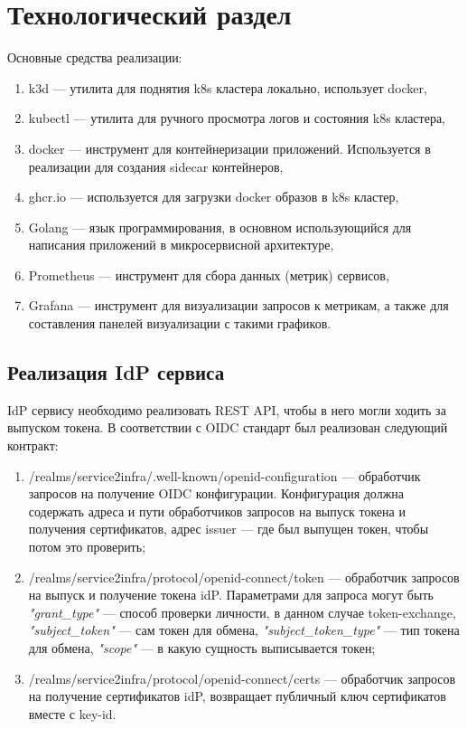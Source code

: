 \chapter{Технологический раздел}

Основные средства реализации:
\begin{enumerate}
\item k3d --- утилита для поднятия k8s кластера локально, использует docker, %
\item kubectl --- утилита для ручного просмотра логов и состояния k8s кластера,
\item docker --- инструмент для контейнеризации приложений. Используется в реализации для создания sidecar контейнеров,
\item ghcr.io --- используется для загрузки docker образов в k8s кластер,
\item Golang --- язык программирования, в основном использующийся для написания приложений в микросервисной архитектуре, %
\item Prometheus --- инструмент для сбора данных (метрик) сервисов,
\item Grafana --- инструмент для визуализации запросов к метрикам, а также для составления панелей визуализации с такими графиков.
\end{enumerate}

\section{Реализация IdP сервиса}

IdP сервису необходимо реализовать REST API, чтобы в него могли ходить за выпуском токена.
В соответствии с OIDC стандарт был реализован следующий контракт:

\begin{enumerate}
\item /realms/service2infra/.well-known/openid-configuration --- обработчик запросов на получение OIDC конфигурации. Конфигурация должна содержать адреса и пути обработчиков запросов на выпуск токена и получения сертификатов, адрес issuer --- где был выпущен токен, чтобы потом это проверить;
\item /realms/service2infra/protocol/openid-connect/token --- обработчик запросов на выпуск и получение токена idP. Параметрами для запроса могут быть \textit{"grant\_type"} --- способ проверки личности, в данном случае token-exchange, \textit{"subject\_token"} --- сам токен для обмена, \textit{"subject\_token\_type"} --- тип токена для обмена, \textit{"scope"} --- в какую сущность выписывается токен;
\item /realms/service2infra/protocol/openid-connect/certs --- обработчик запросов на получение сертификатов idP, возвращает публичный ключ сертификатов вместе с key-id.
\end{enumerate}

